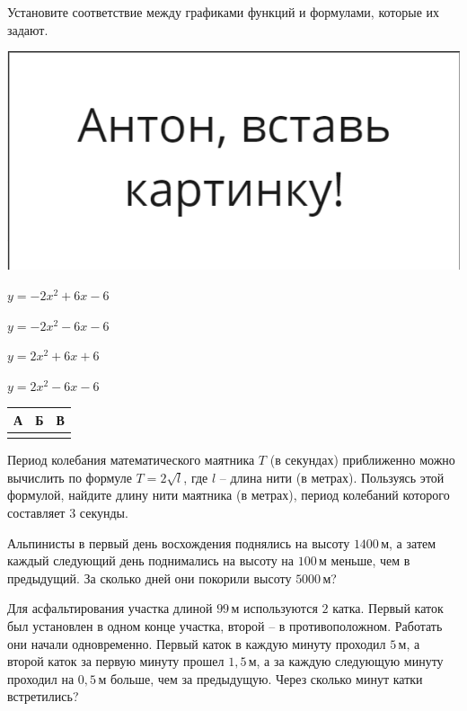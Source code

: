 \begin{class}[number=4]
\begin{listofex}
	\item 
	\begin{minipage}[t]{0.57\textwidth}
		Установите соответствие между графиками функций и формулами, которые их задают.
	\end{minipage}
	\begin{minipage}[c]{0.3\textwidth}
		\includegraphics[align=t, width=\textwidth]{pics/G91M4L4-1}
	\end{minipage}
	\begin{enumcols}[itemcolumns=1]
		\item \( y=-2x^2+6x-6 \)
		\item \( y=-2x^2-6x-6 \)
		\item \( y=2x^2+6x+6 \)
		\item \( y=2x^2-6x-6 \)
	\end{enumcols}
	\begin{center}
		\footnotesize
		\begin{tabular}{|c|c|c|}
			\hline
			А&Б&В\\
			\hline
			& & \\
			\hline
		\end{tabular}
	\end{center}
	
	\item Период колебания математического маятника \( T \) (в секундах) приближенно можно вычислить по формуле \( T=2\sqrt{l} \), где \( l \) -- длина нити (в метрах). Пользуясь этой формулой, найдите длину нити маятника (в метрах), период колебаний которого составляет \( 3 \) секунды.
	
	\item Альпинисты в первый день восхождения поднялись на высоту \( 1400 \) м, а затем каждый следующий день поднимались на высоту на \( 100 \) м меньше, чем в предыдущий. За сколько дней они покорили высоту \( 5000 \) м?
	
	\item Для асфальтирования участка длиной \( 99 \) м используются \( 2  \) катка. Первый каток был установлен в одном конце участка, второй -- в противоположном. Работать они начали одновременно. Первый каток в каждую минуту проходил \( 5 \) м, а второй каток за первую минуту прошел \( 1,5 \) м, а за каждую следующую минуту проходил на \( 0,5 \) м больше, чем за предыдущую. Через сколько минут катки встретились?
	

\end{listofex}
\end{class}
